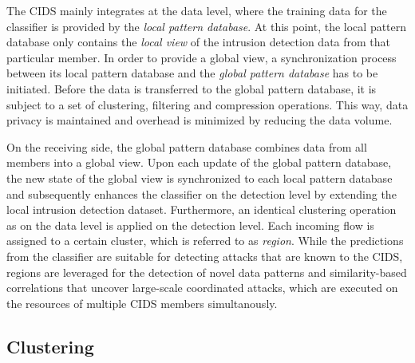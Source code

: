 \documentclass[../../main.tex]{subfiles}
\begin{document}
The CIDS mainly integrates at the data level, where the training data for the classifier is provided by the \textit{local pattern database}. At this point, the local pattern database only contains the \textit{local view} of the intrusion detection data from that particular member. In order to provide a global view, a synchronization process between its local pattern database and the \textit{global pattern database} has to be initiated. Before the data is transferred to the global pattern database, it is subject to a set of clustering, filtering and compression operations. This way, data privacy is maintained and overhead is minimized by reducing the data volume. 

On the receiving side, the global pattern database combines data from all members into a global view. Upon each update of the global pattern database, the new state of the global view is synchronized to each local pattern database and subsequently enhances the classifier on the detection level by extending the local intrusion detection dataset. Furthermore, an identical clustering operation as on the data level is applied on the detection level. Each incoming flow is assigned to a certain cluster, which is referred to as \textit{region}. While the predictions from the classifier are suitable for detecting attacks that are known to the CIDS, regions are leveraged for the detection of novel data patterns and similarity-based correlations that uncover large-scale coordinated attacks, which are executed on the resources of multiple CIDS members simultanously.

\subsection{Clustering}\label{subsec:clustering}
\end{document}
